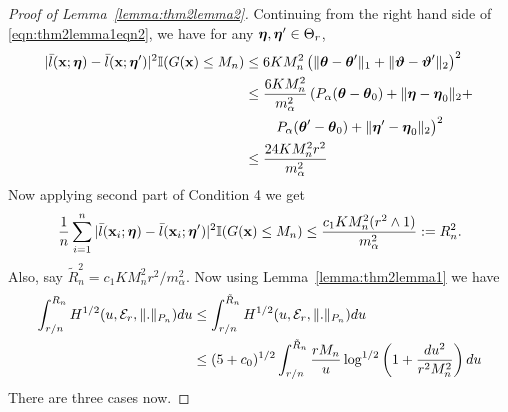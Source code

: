 \documentclass[11pt,letterpaper]{article}
\numberwithin{equation}{section}
\begin{document}
\begin{proof}[Proof of Lemma~\ref{lemma:thm2lemma2}]
Continuing from the right hand side of \eqref{eqn:thm2lemma1eqn2}, we have for any ${\boldsymbol{\eta}}, {\boldsymbol{\eta}}' \in \Theta_r$,
%
\begin{align*}
| \bar l({\bf{x}}; {\boldsymbol{\eta}}) -  \bar l( {\bf{x}}; {\boldsymbol{\eta}}')|^2 {\mathbb{I}}(G({\bf{x}}) \leq M_n ) & \leq
6K M_n^2 \left( \| {\boldsymbol{\theta}} - {\boldsymbol{\theta}}'\|_1 + \| {\boldsymbol{\vartheta}} - {\boldsymbol{\vartheta}}' \|_2 \right)^2\\
& \leq \frac{6 K M_n^2}{m_\alpha^2}
\left( P_\alpha( {\boldsymbol{\theta}} - {\boldsymbol{\theta}}_0) + \| {\boldsymbol{\eta}} - {\boldsymbol{\eta}}_0 \|_2 + \right.\\
& \qquad \left. P_\alpha( {\boldsymbol{\theta}}' - {\boldsymbol{\theta}}_0) + \| {\boldsymbol{\eta}}' - {\boldsymbol{\eta}}_0 \|_2 \right)^2\\
& \leq \frac{24 K M_n^2 r^2}{m_\alpha^2}
\end{align*}
%
Now applying second part of Condition 4 we get
%
\begin{align}\label{eqn:thm2lemma2eqn1}
\frac{1}{n} \sum_{i=1}^n | \bar l({\bf{x}}_i; {\boldsymbol{\eta}}) -  \bar l( {\bf{x}}_i; {\boldsymbol{\eta}}')|^2 {\mathbb{I}}(G({\bf{x}}) \leq M_n ) \leq
\frac{c_1 K M_n^2 ( r^2 \wedge 1)}{m_\alpha^2} := R_n^2.
\end{align}
%
Also, say $\tilde R_n^2 = c_1 K M_n^2 r^2 /m_\alpha^2$. Now using Lemma~\ref{lemma:thm2lemma1} we have
%
\begin{align}
\int_{r/n}^{R_n} H^{1/2} (u, {\cal{E}}_r, \|.\|_{P_n}) du & \leq
\int_{r/n}^{\tilde R_n} H^{1/2} (u, {\cal{E}}_r, \|.\|_{P_n}) du \notag\\
& \leq ( 5 + c_0 )^{1/2}  \int_{r/n}^{\tilde R_n}
\frac{ r M_n }{u} \log^{1/2} \left( 1 + \frac{ d u^2}{r^2 M_n^2} \right) du \label{eqn:thm2lemma2eqn2}
\end{align}
%
%
%
%
There are three cases now.


\end{proof}
\end{document}
